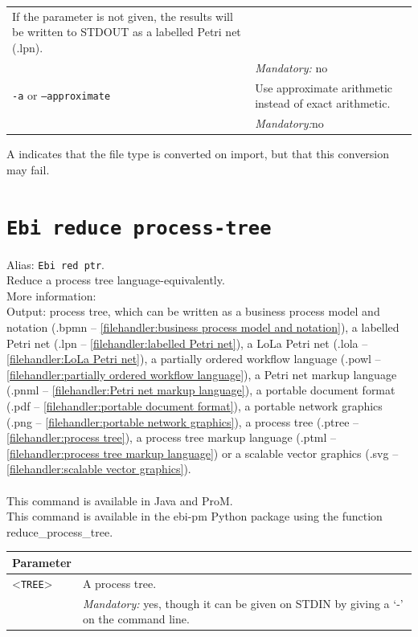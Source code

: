 {\begin{tabularx}{\linewidth}{lX}
If the parameter is not given, the results will be written to STDOUT as a labelled Petri net (.lpn).\\
&\textit{Mandatory:} \quad no\\
\texttt{-a} or \texttt{--approximate} & Use approximate arithmetic instead of exact arithmetic.\\
&\textit{Mandatory:}\quad no\\
\bottomrule
\end{tabularx}
A \textdagger{} indicates that the file type is converted on import, but that this conversion may fail.
\clearpage\section{\texttt{Ebi reduce process-tree}}
\label{command:Ebi reduce process-tree}
Alias: \texttt{Ebi red ptr}.\\
Reduce a process tree language-equivalently.\\
More information: \cite{DBLP:journals/corr/abs-2203-10410}~\\
\noindent Output: process tree, which can be written as a business process model and notation (.bpmn -- \cref{filehandler:business process model and notation}), a labelled Petri net (.lpn -- \cref{filehandler:labelled Petri net}), a LoLa Petri net (.lola -- \cref{filehandler:LoLa Petri net}), a partially ordered workflow language (.powl -- \cref{filehandler:partially ordered workflow language}), a Petri net markup language (.pnml -- \cref{filehandler:Petri net markup language}), a portable document format (.pdf -- \cref{filehandler:portable document format}), a portable network graphics (.png -- \cref{filehandler:portable network graphics}), a process tree (.ptree -- \cref{filehandler:process tree}), a process tree markup language (.ptml -- \cref{filehandler:process tree markup language}) or a scalable vector graphics (.svg -- \cref{filehandler:scalable vector graphics}).\\
\\This command is available in Java and ProM.
\\This command is available in the ebi-pm Python package using the function reduce\_process\_tree.
\begin{tabularx}{\linewidth}{lX}
\toprule
Parameter \\\midrule
<\texttt{TREE}>&A process tree.\\
&\textit{Mandatory:} \quad yes, though it can be given on STDIN by giving a `-' on the command line.\\

\end{tabularx}}
